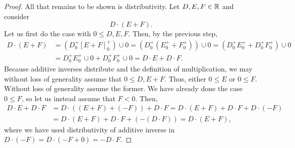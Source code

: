 \begin{thm}
\begin{proof}
All that remains to be shown is distributivity.  Let $D,E,F\in \mathbb{R}$ and consider
\begin{equation}
D\cdot (E+F).
\end{equation}
Let us first do the case with $0\leq D,E,F$.  Then, by the previous step,
\begin{equation}
\begin{split}
D\cdot (E+F) & =\left( D_0^+[E+F]_0^+\right) \cup 0=\left( D_0^+(E_0^++F_0^+)\right) \cup 0=\left( D_0^+E_0^++D_0^+F_0^+\right) \cup 0 \\
& =D_0^+E_0^+\cup 0+D_0^+F_0^+\cup 0=D\cdot E+D\cdot F.
\end{split}
\end{equation}
Because additive inverses distribute and the definition of multiplication, we may without loss of generality assume that $0\leq D,E+F$.  Thus, either $0\leq E$ or $0\leq F$.  Without loss of generality assume the former.  We have already done the case $0\leq F$, so let us instead assume that $F<0$.  Then,
\begin{equation}
\begin{split}
D\cdot E+D\cdot F & =D\cdot \left( (E+F)+(-F)\right) +D\cdot F=D\cdot (E+F)+D\cdot F+D\cdot (-F) \\
& =D\cdot (E+F)+D\cdot F+\left( -(D\cdot F)\right) =D\cdot (E+F),
\end{split}
\end{equation}
where we have used distributivity of additive inverse in $D\cdot (-F)=D\cdot (-F+0)=-D\cdot F$.


\end{proof}
\end{thm}
